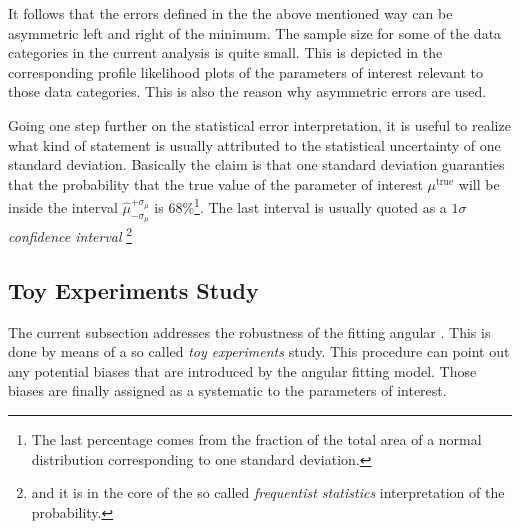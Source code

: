 It follows that the errors defined in the the above mentioned way can be asymmetric left and right of the minimum.
The sample size for some of the data categories in the current analysis is quite small. This is depicted in the corresponding profile
likelihood plots of the parameters of interest relevant to those data categories. This is also the reason why asymmetric errors are used.

Going one step further on the statistical error interpretation, it is useful to realize what kind of statement is usually
attributed to the statistical uncertainty of one standard deviation. Basically the claim is that one standard deviation
guaranties that the probability that the true value of the parameter of interest $\mu^{\text{true}}$ will be inside the
interval $\hat{\mu}_{-\sigma_\mu}^{+\sigma_\mu}$ is $68\%$\footnote{The last percentage comes from the fraction of the total area of a normal distribution corresponding to one standard deviation.}.
The last interval is usually quoted as a $1\sigma$ {\it confidence interval} \footnote{and it is in the core of the so called {\it frequentist statistics}
interpretation of the probability.}





\subsection{Toy Experiments Study}
\label{Toy_Experiments_Study}

The current subsection addresses the robustness of the fitting angular \pdf.
This is done by means of a so called {\it toy experiments} study. This procedure
can point out any potential biases that are introduced by the angular fitting model.
Those biases are finally assigned as a systematic to the parameters of interest.


